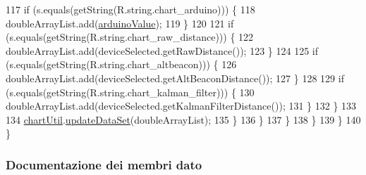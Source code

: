 \begin{DoxyCode}
117                                 \textcolor{keywordflow}{if} (s.equals(getString(R.string.chart\_arduino))) \{
118                                     doubleArrayList.add(\hyperlink{classit_1_1unibo_1_1torsello_1_1bluetoothpositioning_1_1fragment_1_1devicesObservers_1_1DeviceChartFragment_a913e9b39a11d361793d7884bd2ddfd4c_a913e9b39a11d361793d7884bd2ddfd4c}{arduinoValue});
119                                 \}
120 
121                                 \textcolor{keywordflow}{if} (s.equals(getString(R.string.chart\_raw\_distance))) \{
122                                     doubleArrayList.add(deviceSelected.getRawDistance());
123                                 \}
124 
125                                 \textcolor{keywordflow}{if} (s.equals(getString(R.string.chart\_altbeacon))) \{
126                                     doubleArrayList.add(deviceSelected.getAltBeaconDistance());
127                                 \}
128 
129                                 \textcolor{keywordflow}{if} (s.equals(getString(R.string.chart\_kalman\_filter))) \{
130                                     doubleArrayList.add(deviceSelected.getKalmanFilterDistance());
131                                 \}
132                             \}
133 
134                             \hyperlink{classit_1_1unibo_1_1torsello_1_1bluetoothpositioning_1_1fragment_1_1devicesObservers_1_1DeviceChartFragment_afe4ee0e5d07f3efb6887428c9ef04a2e_afe4ee0e5d07f3efb6887428c9ef04a2e}{chartUtil}.\hyperlink{classit_1_1unibo_1_1torsello_1_1bluetoothpositioning_1_1util_1_1ChartUtil_aa9bda04d2c2058fb1b3fcd72c5a7471d_aa9bda04d2c2058fb1b3fcd72c5a7471d}{updateDataSet}(doubleArrayList);
135                         \}
136                     \}
137                 \}
138             \}
139         \}
140     \}
\end{DoxyCode}


\subsubsection{Documentazione dei membri dato}
\hypertarget{classit_1_1unibo_1_1torsello_1_1bluetoothpositioning_1_1fragment_1_1devicesObservers_1_1DeviceChartFragment_a913e9b39a11d361793d7884bd2ddfd4c_a913e9b39a11d361793d7884bd2ddfd4c}{}\label{classit_1_1unibo_1_1torsello_1_1bluetoothpositioning_1_1fragment_1_1devicesObservers_1_1DeviceChartFragment_a913e9b39a11d361793d7884bd2ddfd4c_a913e9b39a11d361793d7884bd2ddfd4c} 
